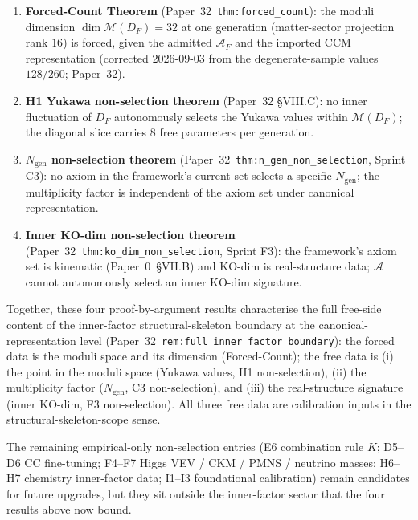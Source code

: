 \documentclass[11pt,a4paper]{article}
\theoremstyle{plain}
\theoremstyle{definition}
\newcommand{\Ngen}{N_{\mathrm{gen}}}
\begin{document}
\begin{enumerate}
  \item \textbf{Forced-Count Theorem} (Paper~32~\texttt{thm:forced\_count}):  the moduli dimension $\dim \mathcal{M}(D_F) = 32$ at one generation (matter-sector projection rank $16$) is forced, given the admitted $\mathcal{A}_F$ and the imported CCM representation (corrected 2026-09-03 from the degenerate-sample values $128/260$; Paper~32).
  \item \textbf{H1 Yukawa non-selection theorem} (Paper~32 \S VIII.C):  no inner fluctuation of $D_F$ autonomously selects the Yukawa values within $\mathcal{M}(D_F)$;  the diagonal slice carries 8 free parameters per generation.
  \item \textbf{$N_{\mathrm{gen}}$ non-selection theorem} (Paper~32~\texttt{thm:n\_gen\_non\_selection}, Sprint C3):  no axiom in the framework's current set selects a specific $N_{\mathrm{gen}}$;  the multiplicity factor is independent of the axiom set under canonical representation.
  \item \textbf{Inner KO-dim non-selection theorem} (Paper~32~\texttt{thm:ko\_dim\_non\_selection}, Sprint F3):  the framework's axiom set is kinematic (Paper~0~\S VII.B) and KO-dim is real-structure data;  $\mathcal{A}$ cannot autonomously select an inner KO-dim signature.
\end{enumerate}

Together, these four proof-by-argument results characterise the full free-side content of the inner-factor structural-skeleton boundary at the canonical-representation level (Paper~32~\texttt{rem:full\_inner\_factor\_boundary}):  the forced data is the moduli space and its dimension (Forced-Count); the free data is (i) the point in the moduli space (Yukawa values, H1 non-selection), (ii) the multiplicity factor ($\Ngen$, C3 non-selection), and (iii) the real-structure signature (inner KO-dim, F3 non-selection). All three free data are calibration inputs in the structural-skeleton-scope sense.

The remaining empirical-only non-selection entries (E6 combination rule $K$; D5--D6 CC fine-tuning; F4--F7 Higgs VEV / CKM / PMNS / neutrino masses; H6--H7 chemistry inner-factor data; I1--I3 foundational calibration) remain candidates for future upgrades, but they sit outside the inner-factor sector that the four results above now bound.
\end{document}
